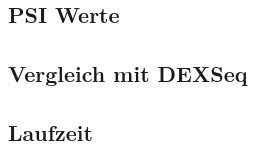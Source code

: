 \documentclass[12pt]{article}
\begin{document}
\subsection{PSI Werte}
\subsection{Vergleich mit DEXSeq}
\subsection{Laufzeit}





\newpage
\printbibliography
\end{document}
